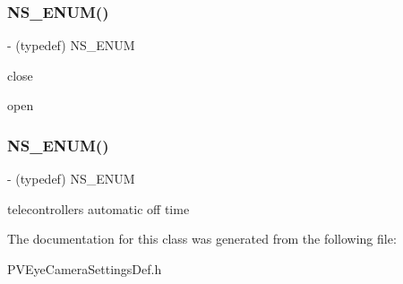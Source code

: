 \subsubsection{\texorpdfstring{N\+S\+\_\+\+E\+N\+U\+M()}{NS\_ENUM()}\hspace{0.1cm}{\footnotesize\ttfamily [16/17]}}
{\footnotesize\ttfamily -\/ (typedef) N\+S\+\_\+\+E\+N\+UM \begin{DoxyParamCaption}\item[{(N\+S\+U\+Integer)}]{ }\item[{(P\+V\+Eye\+O\+S\+D\+Switch\+State)}]{ }\end{DoxyParamCaption}}

close

open\mbox{\label{interface_p_v_eye_camera_settings_def_aae60f89a6b838c13e91d1321666ddf46}} 
\subsubsection{\texorpdfstring{N\+S\+\_\+\+E\+N\+U\+M()}{NS\_ENUM()}\hspace{0.1cm}{\footnotesize\ttfamily [17/17]}}
{\footnotesize\ttfamily -\/ (typedef) N\+S\+\_\+\+E\+N\+UM \begin{DoxyParamCaption}\item[{(N\+S\+U\+Integer)}]{ }\item[{(P\+V\+Eye\+Camera\+Auto\+Off\+Time)}]{ }\end{DoxyParamCaption}}

telecontroller\textquotesingle{}s automatic off time 

The documentation for this class was generated from the following file\+:\begin{DoxyCompactItemize}
\item 
P\+V\+Eye\+Camera\+Settings\+Def.\+h\end{DoxyCompactItemize}
